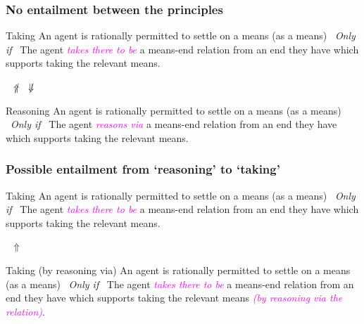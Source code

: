 \documentclass[noamssymb, compress, handout]{beamer} %
\begin{document}
\begin{frame}
  \frametitle{No entailment between the principles}

  \begin{block}{Taking}
    An agent is rationally permitted to settle on a means (as a means)
    \newline
    \mbox{ }\hfill\emph{Only if}\hfill\mbox{ }
    \newline
    The agent \textcolor{fuchsia}{\emph{takes there to be}} a means-end relation from an end they have which supports taking the relevant means.
  \end{block}


  {\Large \mbox{ }\hfill \(\not\Uparrow\) \qquad \(\not\Downarrow\) \hfill\mbox{ }}

    \begin{block}{Reasoning}
    An agent is rationally permitted to settle on a means (as a means)
    \newline
    \mbox{ }\hfill\emph{Only if}\hfill\mbox{ }
    \newline
    The agent \textcolor{fuchsia}{\emph{reasons via}}  a means-end relation from an end they have which supports taking the relevant means.
  \end{block}
\end{frame}


\begin{frame}
  \frametitle{Possible entailment from `reasoning' to `taking'}

  \begin{block}{Taking}
    An agent is rationally permitted to settle on a means (as a means)
    \newline
    \mbox{ }\hfill\emph{Only if}\hfill\mbox{ }
    \newline
    The agent \textcolor{fuchsia}{\emph{takes there to be}} a means-end relation from an end they have which supports taking the relevant means.
  \end{block}

  {\Large \mbox{ }\hfill\(\Uparrow\)\hfill\mbox{ }}

    \begin{block}{Taking (by reasoning via)}
    An agent is rationally permitted to settle on a means (as a means)
    \newline
    \mbox{ }\hfill\emph{Only if}\hfill\mbox{ }
    \newline
    The agent \textcolor{fuchsia}{\emph{takes there to be}}  a means-end relation from an end they have which supports taking the relevant means \textcolor{fuchsia}{\emph{(by reasoning via the relation)}}.
  \end{block}
\end{frame}
\end{document}
